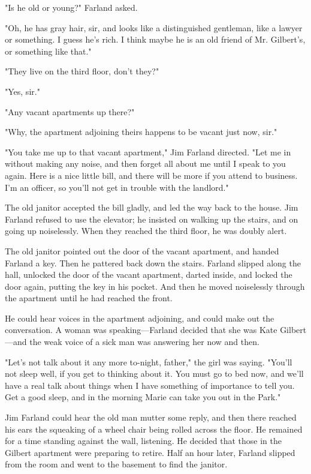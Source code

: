 \documentclass{novel}
\begin{document}
"Is he old or young?" Farland asked.

"Oh, he has gray hair, sir, and looks like a distinguished gentleman, like a lawyer or something. I guess he's rich. I think maybe he is an old friend of Mr. Gilbert's, or something like that."

"They live on the third floor, don't they?"

"Yes, sir."

"Any vacant apartments up there?"

"Why, the apartment adjoining theirs happens to be vacant just now, sir."

"You take me up to that vacant apartment," Jim Farland directed. "Let me in without making any noise, and then forget all about me until I speak to you again. Here is a nice little bill, and there will be more if you attend to business. I'm an officer, so you'll not get in trouble with the landlord."

The old janitor accepted the bill gladly, and led the way back to the house. Jim Farland refused to use the elevator; he insisted on walking up the stairs, and on going up noiselessly. When they reached the third floor, he was doubly alert.

The old janitor pointed out the door of the vacant apartment, and handed Farland a key. Then he pattered back down the stairs. Farland slipped along the hall, unlocked the door of the vacant apartment, darted inside, and locked the door again, putting the key in his pocket. And then he moved noiselessly through the apartment until he had reached the front.

He could hear voices in the apartment adjoining, and could make out the conversation. A woman was speaking---Farland decided that she was Kate Gilbert---and the weak voice of a sick man was answering her now and then.

"Let's not talk about it any more to-night, father," the girl was saying. "You'll not sleep well, if you get to thinking about it. You must go to bed now, and we'll have a real talk about things when I have something of importance to tell you. Get a good sleep, and in the morning Marie can take you out in the Park."

Jim Farland could hear the old man mutter some reply, and then there reached his ears the squeaking of a wheel chair being rolled across the floor. He remained for a time standing against the wall, listening. He decided that those in the Gilbert apartment were preparing to retire. Half an hour later, Farland slipped from the room and went to the basement to find the janitor.
\end{document}
